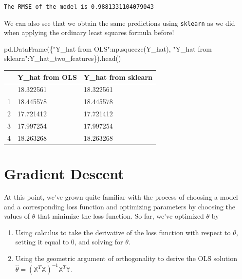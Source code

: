 \documentclass[
  letterpaper,
  DIV=11,
  numbers=noendperiod]{scrreprt}
\newenvironment{Shaded}{\begin{snugshade}}{\end{snugshade}}
\newcommand{\NormalTok}[1]{\textcolor[rgb]{0.00,0.23,0.31}{#1}}
\newcommand{\StringTok}[1]{\textcolor[rgb]{0.13,0.47,0.30}{#1}}
\providecommand{\tightlist}{%
  \setlength{\itemsep}{0pt}\setlength{\parskip}{0pt}}\usepackage{longtable,booktabs,array}
\begin{document}
\begin{verbatim}
The RMSE of the model is 0.9881331104079043
\end{verbatim}

We can also see that we obtain the same predictions using
\texttt{sklearn} as we did when applying the ordinary least squares
formula before!

\begin{Shaded}
\begin{Highlighting}[]
\NormalTok{pd.DataFrame(\{}\StringTok{"Y\_hat from OLS"}\NormalTok{:np.squeeze(Y\_hat), }\StringTok{"Y\_hat from sklearn"}\NormalTok{:Y\_hat\_two\_features\}).head()}
\end{Highlighting}
\end{Shaded}

\begin{longtable}[]{@{}lll@{}}
\toprule\noalign{}
& Y\_hat from OLS & Y\_hat from sklearn \\
\midrule\noalign{}
\endhead
\bottomrule\noalign{}
\endlastfoot
0 & 18.322561 & 18.322561 \\
1 & 18.445578 & 18.445578 \\
2 & 17.721412 & 17.721412 \\
3 & 17.997254 & 17.997254 \\
4 & 18.263268 & 18.263268 \\
\end{longtable}

\section{Gradient Descent}\label{gradient-descent}

At this point, we've grown quite familiar with the process of choosing a
model and a corresponding loss function and optimizing parameters by
choosing the values of \(\theta\) that minimize the loss function. So
far, we've optimized \(\theta\) by

\begin{enumerate}
\def\labelenumi{\arabic{enumi}.}
\tightlist
\item
  Using calculus to take the derivative of the loss function with
  respect to \(\theta\), setting it equal to 0, and solving for
  \(\theta\).
\item
  Using the geometric argument of orthogonality to derive the OLS
  solution
  \(\hat{\theta} = (\mathbb{X}^T \mathbb{X})^{-1}\mathbb{X}^T \mathbb{Y}\).
\end{enumerate}
\end{document}
